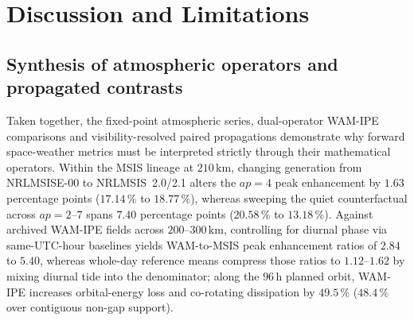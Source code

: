 \documentclass[12pt]{article}
\newcommand{\unit}[1]{\,\mathrm{#1}}
\begin{document}
\section{Discussion and Limitations}
\label{sec:discussion}

\subsection{Synthesis of atmospheric operators and propagated contrasts}
\label{sec:synthesis}

Taken together, the fixed-point atmospheric series, dual-operator WAM-IPE comparisons and visibility-resolved paired propagations demonstrate why forward space-weather metrics must be interpreted strictly through their mathematical operators. Within the MSIS lineage at $210\unit{km}$, changing generation from NRLMSISE-00 to NRLMSIS~2.0/2.1 alters the $ap=4$ peak enhancement by $1.63$ percentage points ($17.14\,\%$ to $18.77\,\%$), whereas sweeping the quiet counterfactual across $ap=2$--$7$ spans $7.40$ percentage points ($20.58\,\%$ to $13.18\,\%$). Against archived WAM-IPE fields across $200$--$300\unit{km}$, controlling for diurnal phase via same-UTC-hour baselines yields WAM-to-MSIS peak enhancement ratios of $2.84$ to $5.40$, whereas whole-day reference means compress those ratios to $1.12$--$1.62$ by mixing diurnal tide into the denominator; along the $96\unit{h}$ planned orbit, WAM-IPE increases orbital-energy loss and co-rotating dissipation by $49.5\,\%$ ($48.4\,\%$ over contiguous non-gap support).
\end{document}
